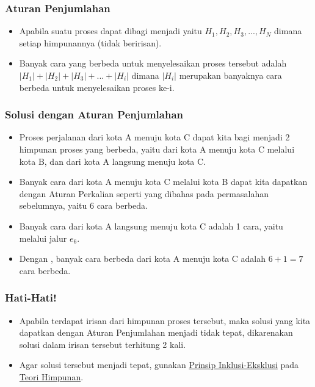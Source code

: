 \begin{frame}
\frametitle{Aturan Penjumlahan}
\begin{itemize}
  \item Apabila suatu proses dapat dibagi menjadi  yaitu $H_{1}, H_{2}, H_{3}, ... , H_{N}$ dimana setiap himpunannya  (tidak beririsan).
  \item Banyak cara yang berbeda untuk menyelesaikan proses tersebut adalah $|H_{1}| + |H_{2}| + |H_{3}| + ... + |H_{i}|$ dimana $|H_{i}|$ merupakan banyaknya cara berbeda untuk menyelesaikan proses ke-i.
\end{itemize}
\end{frame}

\begin{frame}
\frametitle{Solusi dengan Aturan Penjumlahan}
\begin{itemize}
  \item Proses perjalanan dari kota A menuju kota C dapat kita bagi menjadi 2 himpunan proses yang berbeda, yaitu dari kota A menuju kota C melalui kota B, dan dari kota A langsung menuju kota C.
  \item Banyak cara dari kota A menuju kota C melalui kota B dapat kita dapatkan dengan Aturan Perkalian seperti yang dibahas pada permasalahan sebelumnya, yaitu 6 cara berbeda.
  \item Banyak cara dari kota A langsung menuju kota C adalah 1 cara, yaitu melalui jalur $e_{6}$.
  \item Dengan , banyak cara berbeda dari kota A menuju kota C adalah $6 + 1 = 7$ cara berbeda.
\end{itemize}
\end{frame}

\begin{frame}
\frametitle{Hati-Hati!}
\begin{itemize}
  \item Apabila terdapat irisan dari himpunan proses tersebut, maka solusi yang kita dapatkan dengan Aturan Penjumlahan menjadi tidak tepat, dikarenakan solusi dalam irisan tersebut terhitung 2 kali.
  \item Agar solusi tersebut menjadi tepat, gunakan \textcolor{blue}{\href{https://en.wikipedia.org/wiki/Inclusion-exclusion\_principle}{Prinsip Inklusi-Eksklusi}} pada \textcolor{blue}{\href{https://id.wikipedia.org/wiki/Himpunan}{Teori Himpunan}}.
\end{itemize}
\end{frame}

